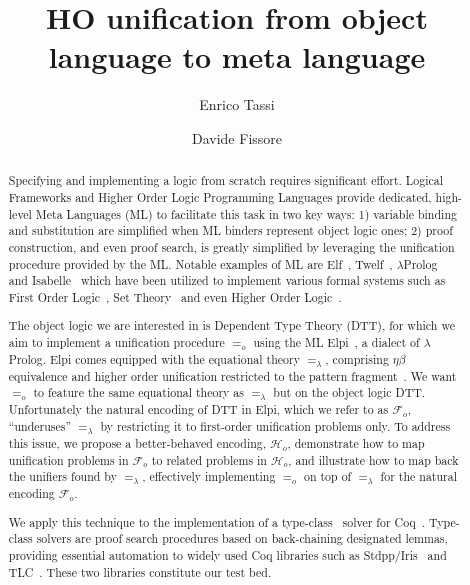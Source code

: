 \documentclass[acmengage]{acmart}
\newcommand{\U}{\ensuremath{=_o}}
\newcommand{\Ue}{\ensuremath{=_\lambda}}
\newcommand{\Fo}{\ensuremath{\mathcal{F}_{\!o}}}
\newcommand{\Ho}{\ensuremath{\mathcal{H}_o}}
\begin{document}
\title{HO unification from object language to meta language} 

\author{Enrico Tassi}

\author{Davide Fissore}

\begin{abstract}
  Specifying and implementing a logic from scratch requires significant effort.
  Logical Frameworks and Higher Order Logic Programming Languages provide
  dedicated, high-level Meta Languages (ML) to facilitate this task in two
  key ways: 1) variable binding and substitution are simplified when ML binders
  represent object logic ones; 2) proof construction, and even proof search, is
  greatly simplified by leveraging the unification procedure provided by the ML.
  Notable examples of ML are Elf~\cite{elf}, Twelf~\cite{twelf},
  $\lambda$Prolog~\cite{miller_nadathur_2012} and
  Isabelle~\cite{10.1007/978-3-540-71067-7_7}
  which have been utilized to implement various formal systems such as
  First Order Logic~\cite{felty88cade},
  Set Theory~\cite{10.1007/BF00881873} and
  even Higher Order Logic~\cite{books/sp/NipkowPW02}.
  
  The object logic we are interested in is Dependent Type Theory (DTT),
  for which we aim to implement a unification procedure \U{} using the ML
  Elpi~\cite{dunchev15lpar}, a dialect of $\lambda$Prolog.
  Elpi comes equipped with the equational theory \Ue{}, comprising
  $\eta\beta$ equivalence
  and higher order unification restricted to the pattern
  fragment~\cite{miller92jsc}.
  We want \U{} to feature the same equational theory as \Ue{} but on the
  object logic DTT.
  Unfortunately the natural encoding of DTT in Elpi, which we refer to as \Fo{},
  ``underuses'' \Ue{} by restricting it to first-order unification problems only. 
  To address this issue, we propose a better-behaved encoding, \Ho{},
  demonstrate how to map unification problems in \Fo{}
  to related problems in \Ho{}, and illustrate
  how to map back the unifiers found by \Ue{}, effectively implementing
   \U{} on top of \Ue{} for the natural encoding \Fo{}.
   
  We apply this technique to the implementation of a type-class~\cite{wadler89}
  solver for Coq~\cite{Coq-refman}.
  Type-class solvers are proof search procedures based on back-chaining designated
  lemmas, providing essential automation to widely used 
  Coq libraries such as Stdpp/Iris~\cite{JUNG_KREBBERS_JOURDAN_BIZJAK_BIRKEDAL_DREYER_2018}
  and TLC~\cite{10.1007/978-3-642-14052-5_15}. These two libraries
  constitute our test bed.
\end{abstract}
\end{document}
